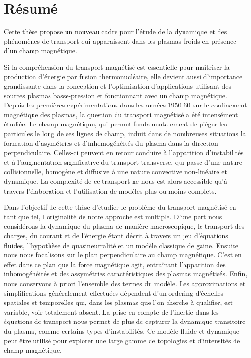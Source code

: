 \thispagestyle{empty}
\cleardoublepage
\thispagestyle{preface}	
	\section*{Résumé}
		Cette thèse propose un nouveau cadre pour l'étude de la dynamique et des
		phénomènes de transport qui apparaissent dans les plasmas froids en présence
		d'un champ magnétique.
				
		Si la compréhension du transport magnétisé est essentielle pour maîtriser la
		production d'énergie par fusion thermonucléaire, elle devient aussi d'importance
		grandissante dans la conception et l'optimisation d'applications utilisant des
		sources plasmas basse-pression et fonctionnant avec un champ magnétique.
		Depuis les premières expérimentations dans les années 1950-60 sur le confinement
		magnétique des plasmas, la question du transport magnétisé a été intensément
		étudiée. Le champ magnétique, qui permet fondamentalement de piéger les
		particules le long de ses lignes de champ, induit dans de nombreuses situations la formation
		d'asymétries et d'inhomogénéités du plasma dans la direction perpendiculaire.
		Celles-ci peuvent en retour conduire à l'apparition d'instabilités et à
		l'augmentation significative du transport transverse, qui passe d'une nature
		collisionnelle, homogène et diffusive à une nature convective non-linéaire et
		dynamique. La complexité de ce transport ne nous est alors accessible qu'à
		travers l'élaboration et l'utilisation de modèles plus ou moins complets.
				
		Dans l'objectif de cette thèse d'étudier le problème du transport magnétisé en
		tant que tel, l'originalité de notre approche est multiple.
		D'une part nous considérons la dynamique du plasma de manière macroscopique, le
		transport des charges, du courant et de l'énergie étant décrit à travers un jeu
		d'équations fluides, l'hypothèse de quasineutralité et un modèle classique de
		gaine.
		Ensuite nous nous focalisons sur le plan perpendiculaire au champ magnétique.
		C'est en effet dans ce plan que la force magnétique agit, entraînant
		l'apparition des inhomogénéités et des assymétries caractéristiques des plasmas
		magnétisés.
		Enfin, nous conservons à priori l'ensemble des termes du modèle.
		Les approximations et simplifications généralement effectuées dépendent d'un
		ordering d'échelles spatiales et temporelles qui, dans les plasmas que l'on
		cherche à qualifier, est variable, voir totalement absent.
		La prise en compte de l'inertie dans les équations de transport nous permet de
		plus de capturer la dynamique transitoire du plasma, comme certains types
		d'instabilités. Ce modèle fluide et dynamique peut être utilisé pour explorer
		une large gamme de topologies et d'intensités de champ magnétique.
				
